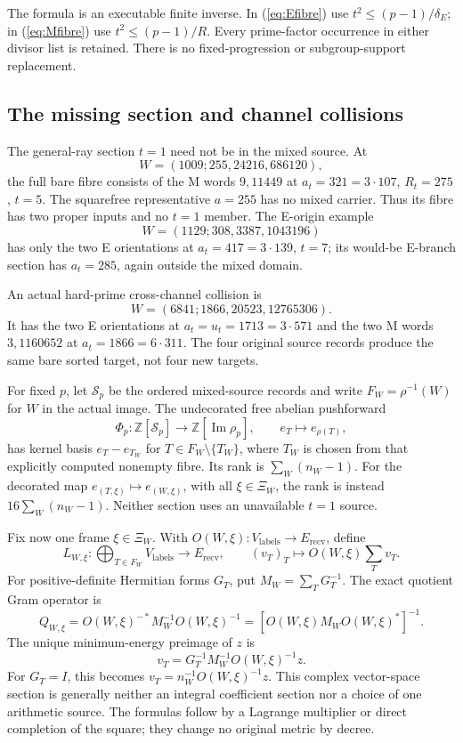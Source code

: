 The formula is an executable finite inverse. In (\ref{eq:Efibre}) use
$t^2\le(p-1)/\delta_E$; in (\ref{eq:Mfibre}) use
$t^2\le(p-1)/R$. Every prime-factor occurrence in either divisor list is
retained. There is no fixed-progression or subgroup-support replacement.

\subsection{The missing section and channel collisions}
The general-ray section $t=1$ need not be in the mixed source. At
\[
 W=(1009;255,24216,686120),
\]
the full bare fibre consists of the M words $9,11449$ at
$a_t=321=3\cdot107$, $R_t=275$, $t=5$. The squarefree representative
$a=255$ has no mixed carrier. Thus its fibre has two proper inputs and no
$t=1$ member. The E-origin example
\[
 W=(1129;308,3387,1043196)
\]
has only the two E orientations at $a_t=417=3\cdot139$, $t=7$;
 its would-be E-branch section has $a_t=285$, again outside the mixed domain.

An actual hard-prime cross-channel collision is
\[
 W=(6841;1866,20523,12765306).
\]
It has the two E orientations at $a_t=u_t=1713=3\cdot571$ and the two M
words $3,1160652$ at $a_t=1866=6\cdot311$. The four original source records
produce the same bare sorted target, not four new targets.

For fixed $p$, let $\mathcal S_p$ be the ordered mixed-source records and
write $F_W=\rho^{-1}(W)$ for $W$ in the actual image. The undecorated free
abelian pushforward
\[
 \Phi_p:\mathbb Z[\mathcal S_p]\longrightarrow
 \mathbb Z[\operatorname{Im}\rho_p],\qquad e_T\longmapsto e_{\rho(T)},
\]
has kernel basis $e_T-e_{T_W}$ for
$T\in F_W\setminus\{T_W\}$, where $T_W$ is chosen from that explicitly
computed nonempty fibre. Its rank is $\sum_W(n_W-1)$. For the decorated map
$e_{(T,\xi)}\mapsto e_{(W,\xi)}$, with all
$\xi\in\Xi_W$, the rank is instead
$16\sum_W(n_W-1)$. Neither section uses an unavailable $t=1$ source.

Fix now one frame $\xi\in\Xi_W$. With
$O(W,\xi):V_{\mathrm{labels}}\to E_{\mathrm{recv}}$, define
\[
 L_{W,\xi}:\bigoplus_{T\in F_W}V_{\mathrm{labels}}
 \longrightarrow E_{\mathrm{recv}},\qquad
 (v_T)_T\longmapsto O(W,\xi)\sum_Tv_T.
\]
For positive-definite Hermitian forms $G_T$, put
$M_W=\sum_TG_T^{-1}$. The exact quotient Gram operator is
\begin{equation}\label{eq:metricfibre}
 Q_{W,\xi}=O(W,\xi)^{-*}M_W^{-1}O(W,\xi)^{-1}
 =\left[O(W,\xi)M_WO(W,\xi)^*\right]^{-1}.
\end{equation}
The unique minimum-energy preimage of $z$ is
\[
 v_T=G_T^{-1}M_W^{-1}O(W,\xi)^{-1}z.
\]
For $G_T=I$, this becomes
$v_T=n_W^{-1}O(W,\xi)^{-1}z$. This complex vector-space section is generally
neither an integral coefficient section nor a choice of one arithmetic source.
The formulas follow by a Lagrange multiplier or direct completion of the square;
they change no original metric by decree.

